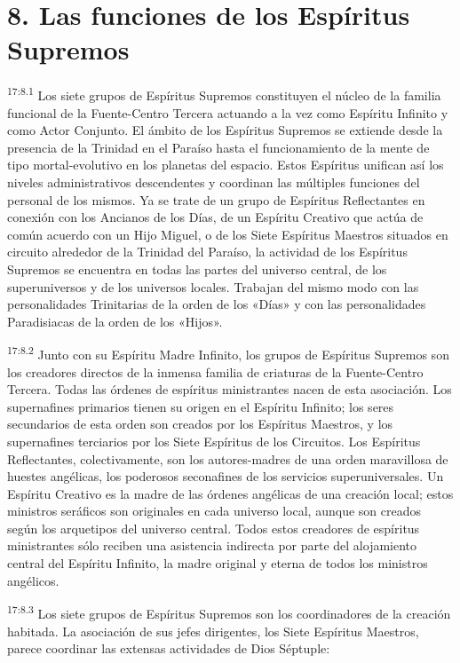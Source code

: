 \section*{8. Las funciones de los Espíritus Supremos}
\par
\textsuperscript{17:8.1} Los siete grupos de Espíritus Supremos constituyen el núcleo de la familia funcional de la Fuente-Centro Tercera actuando a la vez como Espíritu Infinito y como Actor Conjunto. El ámbito de los Espíritus Supremos se extiende desde la presencia de la Trinidad en el Paraíso hasta el funcionamiento de la mente de tipo mortal-evolutivo en los planetas del espacio. Estos Espíritus unifican así los niveles administrativos descendentes y coordinan las múltiples funciones del personal de los mismos. Ya se trate de un grupo de Espíritus Reflectantes en conexión con los Ancianos de los Días, de un Espíritu Creativo que actúa de común acuerdo con un Hijo Miguel, o de los Siete Espíritus Maestros situados en circuito alrededor de la Trinidad del Paraíso, la actividad de los Espíritus Supremos se encuentra en todas las partes del universo central, de los superuniversos y de los universos locales. Trabajan del mismo modo con las personalidades Trinitarias de la orden de los «Días» y con las personalidades Paradisiacas de la orden de los «Hijos».

\par
\textsuperscript{17:8.2} Junto con su Espíritu Madre Infinito, los grupos de Espíritus Supremos son los creadores directos de la inmensa familia de criaturas de la Fuente-Centro Tercera. Todas las órdenes de espíritus ministrantes nacen de esta asociación. Los supernafines primarios tienen su origen en el Espíritu Infinito; los seres secundarios de esta orden son creados por los Espíritus Maestros, y los supernafines terciarios por los Siete Espíritus de los Circuitos. Los Espíritus Reflectantes, colectivamente, son los autores-madres de una orden maravillosa de huestes angélicas, los poderosos seconafines de los servicios superuniversales. Un Espíritu Creativo es la madre de las órdenes angélicas de una creación local; estos ministros seráficos son originales en cada universo local, aunque son creados según los arquetipos del universo central. Todos estos creadores de espíritus ministrantes sólo reciben una asistencia indirecta por parte del alojamiento central del Espíritu Infinito, la madre original y eterna de todos los ministros angélicos.

\par
\textsuperscript{17:8.3} Los siete grupos de Espíritus Supremos son los coordinadores de la creación habitada. La asociación de sus jefes dirigentes, los Siete Espíritus Maestros, parece coordinar las extensas actividades de Dios Séptuple:

